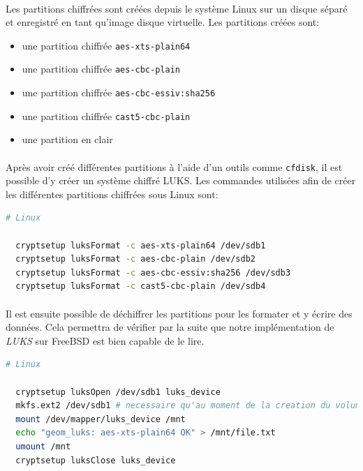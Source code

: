 \paragraph{}
Les partitions chiffrées sont créées depuis le système Linux sur un disque
séparé et enregistré en tant qu'image disque virtuelle. Les partitions créées
sont:
\begin{itemize}
\item une partition chiffrée \texttt{aes-xts-plain64}
\item une partition chiffrée \texttt{aes-cbc-plain}
\item une partition chiffrée \texttt{aes-cbc-essiv:sha256}
\item une partition chiffrée \texttt{cast5-cbc-plain}
\item une partition en clair
\end{itemize}
\paragraph{}
Après avoir créé différentes partitions à l'aide d'un outils comme
\texttt{cfdisk}, il est possible d'y créer un système chiffré LUKS. Les
commandes utilisées afin de créer les différentes partitions chiffrées sous
Linux sont:
\\
\begin{lstlisting}[language=bash]
  # Linux
  
  cryptsetup luksFormat -c aes-xts-plain64 /dev/sdb1
  cryptsetup luksFormat -c aes-cbc-plain /dev/sdb2
  cryptsetup luksFormat -c aes-cbc-essiv:sha256 /dev/sdb3
  cryptsetup luksFormat -c cast5-cbc-plain /dev/sdb4
\end{lstlisting}
\paragraph{}
Il est ensuite possible de déchiffrer les partitions pour les formater et y
écrire des données. Cela permettra de vérifier par la suite que notre
implémentation de \textit{LUKS} sur FreeBSD est bien capable de le lire.
\\
\begin{lstlisting}[language=bash]
  # Linux
  
  cryptsetup luksOpen /dev/sdb1 luks_device
  mkfs.ext2 /dev/sdb1 # necessaire qu'au moment de la creation du volume
  mount /dev/mapper/luks_device /mnt
  echo "geom_luks: aes-xts-plain64 OK" > /mnt/file.txt
  umount /mnt
  cryptsetup luksClose luks_device
\end{lstlisting}
